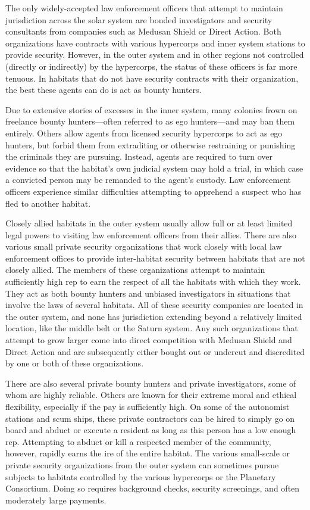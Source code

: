 The only widely-accepted law enforcement officers that attempt to
maintain jurisdiction across the solar system are bonded investigators
and security consultants from companies such as Medusan Shield or
Direct Action. Both organizations have contracts with various
hypercorps and inner system stations to provide security. However, in
the outer system and in other regions not controlled (directly or
indirectly) by the hypercorps, the status of these officers is far
more tenuous. In habitats that do not have security contracts with
their organization, the best these agents can do is act as bounty
hunters.

Due to extensive stories of excesses in the inner system, many
colonies frown on freelance bounty hunters—often referred to as ego
hunters—and may ban them entirely. Others allow agents from licensed
security hypercorps to act as ego hunters, but forbid them from
extraditing or otherwise restraining or punishing the criminals they
are pursuing. Instead, agents are required to turn over evidence so
that the habitat's own judicial system may hold a trial, in which case
a convicted person may be remanded to the agent's custody. Law
enforcement officers experience similar difficulties attempting to
apprehend a suspect who has fled to another habitat.

Closely allied habitats in the outer system usually allow full or at
least limited legal powers to visiting law enforcement officers from
their allies. There are also various small private security
organizations that work closely with local law enforcement offices to
provide inter-habitat security between habitats that are not closely
allied. The members of these organizations attempt to maintain
sufficiently high rep to earn the respect of all the habitats with
which they work. They act as both bounty hunters and unbiased
investigators in situations that involve the laws of several
habitats. All of these security companies are located in the outer
system, and none has jurisdiction extending beyond a relatively
limited location, like the middle belt or the Saturn system. Any such
organizations that attempt to grow larger come into direct competition
with Medusan Shield and Direct Action and are subsequently either
bought out or undercut and discredited by one or both of these
organizations.

There are also several private bounty hunters and private
investigators, some of whom are highly reliable. Others are known for
their extreme moral and ethical flexibility, especially if the pay is
sufficiently high. On some of the autonomist stations and scum ships,
these private contractors can be hired to simply go on board and
abduct or execute a resident as long as this person has a low enough
rep. Attempting to abduct or kill a respected member of the community,
however, rapidly earns the ire of the entire habitat.  The various
small-scale or private security organizations from the outer system
can sometimes pursue subjects to habitats controlled by the various
hypercorps or the Planetary Consortium. Doing so requires background
checks, security screenings, and often moderately large payments.


